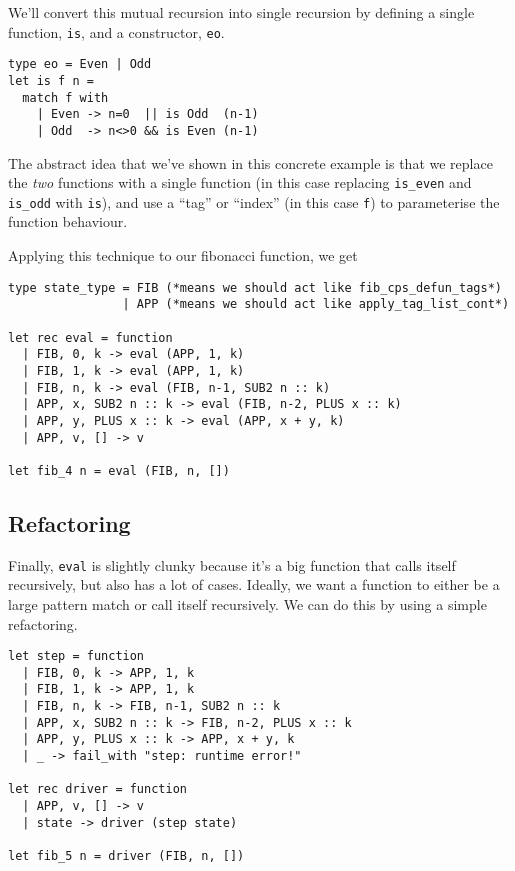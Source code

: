 We'll convert this mutual recursion into single recursion by defining a single function, \texttt{is}, and a constructor, \texttt{eo}.

\begin{code}
\label{code:mutual-recursion}
\begin{verbatim}
type eo = Even | Odd
let is f n = 
  match f with
    | Even -> n=0  || is Odd  (n-1)
    | Odd  -> n<>0 && is Even (n-1)
\end{verbatim}
\end{code}

The abstract idea that we've shown in this concrete example is that we replace the \emph{two} functions with a single function (in this case replacing \texttt{is\_even} and \texttt{is\_odd} with \texttt{is}), and use a ``tag'' or ``index'' (in this case \texttt{f}) to parameterise the function behaviour.

Applying this technique to our fibonacci function, we get

\begin{code}
\label{code:defun-list-fib}
\begin{verbatim}
type state_type = FIB (*means we should act like fib_cps_defun_tags*)
                | APP (*means we should act like apply_tag_list_cont*)

let rec eval = function
  | FIB, 0, k -> eval (APP, 1, k)
  | FIB, 1, k -> eval (APP, 1, k)
  | FIB, n, k -> eval (FIB, n-1, SUB2 n :: k)
  | APP, x, SUB2 n :: k -> eval (FIB, n-2, PLUS x :: k)
  | APP, y, PLUS x :: k -> eval (APP, x + y, k)
  | APP, v, [] -> v

let fib_4 n = eval (FIB, n, [])
\end{verbatim}
\end{code}

\subsection{Refactoring}
Finally, \texttt{eval} is slightly clunky because it's a big function that calls itself recursively, but also has a lot of cases. Ideally, we want a function to either be a large pattern match or call itself recursively. We can do this by using a simple refactoring. 

\begin{code}
\label{code:defun-list-fib}
\begin{verbatim}
let step = function
  | FIB, 0, k -> APP, 1, k
  | FIB, 1, k -> APP, 1, k
  | FIB, n, k -> FIB, n-1, SUB2 n :: k
  | APP, x, SUB2 n :: k -> FIB, n-2, PLUS x :: k
  | APP, y, PLUS x :: k -> APP, x + y, k
  | _ -> fail_with "step: runtime error!"

let rec driver = function
  | APP, v, [] -> v
  | state -> driver (step state)

let fib_5 n = driver (FIB, n, [])
\end{verbatim}
\end{code}

